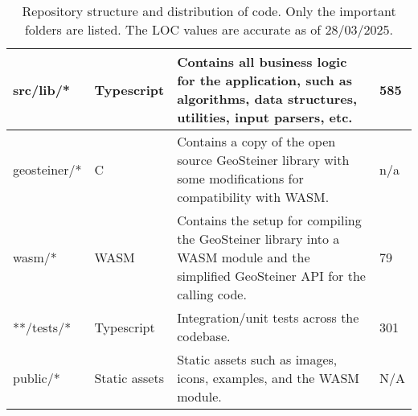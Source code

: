 \begin{table}[h]
\begin{tabular}{|p{5cm}|p{1.5cm}|p{6cm}|p{1cm}|}
        \hline
        \rowcolor{typescriptLight}
        src/lib/*                             & Typescript    & Contains all business logic for the application, such as algorithms, data structures, utilities, input parsers, etc.                                                & 585          \\
        \hline
        \rowcolor{cLight}
        geosteiner/*                          & C             & Contains a copy of the open source GeoSteiner library with some modifications for compatibility with WASM.                                                          & n/a          \\
        \hline
        \rowcolor{wasmLight}
        wasm/*                                & WASM          & Contains the setup for compiling the GeoSteiner library into a WASM module and the simplified GeoSteiner API for the calling code.                                  & 79           \\
        \hline
        \rowcolor{testLight}
        **/tests/*                            & Typescript    & Integration/unit tests across the codebase.                                                                                                                         & 301          \\
        \hline
        \rowcolor{staticLight}
        public/*                              & Static assets & Static assets such as images, icons, examples, and the WASM module.                                                                                                 & N/A          \\
        \hline
    \end{tabular}
    \caption{Repository structure and distribution of code. Only the important folders are listed. The LOC values are accurate as of 28/03/2025.}
    \label{tab:project_structure}
\end{table}